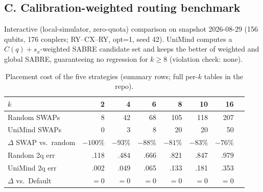 \documentclass[journal,10pt,twocolumn]{IEEEtran}
\begin{document}
\subsection*{C. Calibration-weighted routing benchmark}
\label{app:routing}
Interactive (local-simulator, zero-quota) comparison on snapshot 2026-08-29 (156 qubits, 176 couplers; RY--CX--RY,
opt=1, seed 42). UniMind computes a $C(q)+s_x$-weighted SABRE candidate set and keeps the better of weighted and
global SABRE, guaranteeing no regression for $k\ge8$ (violation check: none).

\begin{table}[h]
\caption{Placement cost of the five strategies (summary rows; full per-$k$ tables in the repo).}
\label{tab:routing2}
\centering
\footnotesize
\setlength{\tabcolsep}{3pt}
\begin{tabular}{@{}lrrrrrrr@{}}
\toprule
$k$ & 2 & 4 & 6 & 8 & 10 & 16\\
\midrule
Random SWAPs & 8 & 42 & 68 & 105 & 118 & 207\\
UniMind SWAPs & 0 & 3 & 8 & 20 & 20 & 50\\
$\Delta$ SWAP vs.\ random & $-100\%$ & $-93\%$ & $-88\%$ & $-81\%$ & $-83\%$ & $-76\%$\\
Random 2q err & .118 & .484 & .666 & .821 & .847 & .979\\
UniMind 2q err & .002 & .049 & .065 & .133 & .181 & .353\\
$\Delta$ vs.\ Default & $=0$ & $=0$ & $=0$ & $=0$ & $=0$ & $=0$\\
\bottomrule
\end{tabular}
\end{table}
\end{document}

